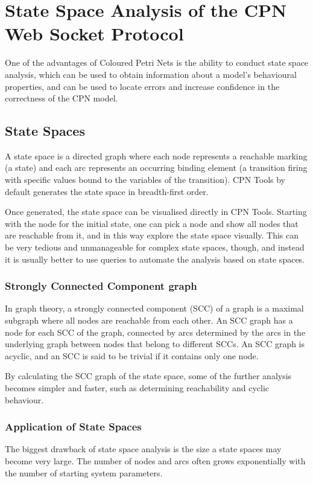\chapter{State Space Analysis of the CPN Web Socket Protocol}
\label{chap:statespace}

One of the advantages of Coloured Petri Nets is the ability to conduct state
space analysis, which can be used to obtain information about a model's
behavioural properties, and can be used to locate errors and increase
confidence in the correctness of the CPN model.

\section{State Spaces}
A state space is a directed graph where each node represents a reachable marking
(a state) and each arc represents an occurring binding element (a transition
firing with specific values bound to the variables of the transition). CPN Tools
by default generates the state space in breadth-first order. 

Once generated, the state space can be visualised directly in CPN Tools.
Starting with the node for the initial state, one can pick a node and show all
nodes that are reachable from it, and in this way explore the state space
visually. This can be very tedious and unmanageable for complex state spaces,
though, and instead it is usually better to use queries to automate the analysis
based on state spaces.

	\subsection{Strongly Connected Component graph}
	In graph theory, a strongly connected component (SCC) of a graph is a maximal
	subgraph where all nodes are reachable from each other. An SCC graph has a node
	for each SCC of the graph, connected by arcs determined by the arcs in the
	underlying graph between nodes that belong to different SCCs. An
	SCC graph is acyclic, and an SCC is said to be trivial if it contains only one
	node.
	
	By calculating the SCC graph of the state space, some of the further
	analysis becomes simpler and faster, such as determining reachability and
	cyclic behaviour.

	\subsection{Application of State Spaces}
		The biggest drawback of state space analysis is the size a state spaces may
		become very large. The number of nodes and arcs often grows exponentially with
		the number of starting system parameters. 
		
